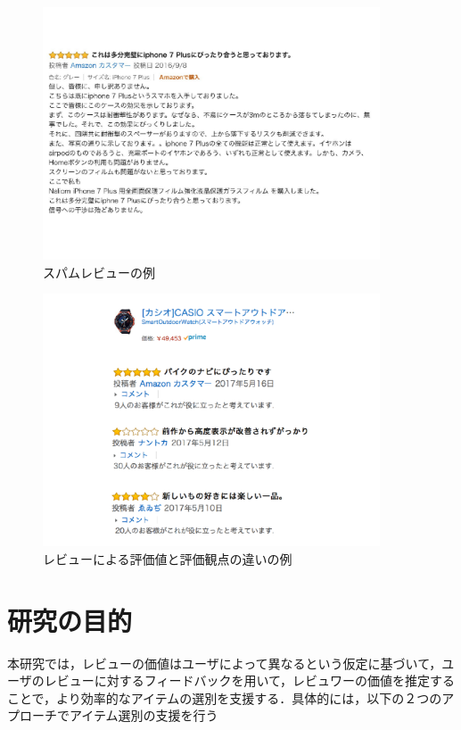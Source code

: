 \documentclass[a4paper,11pt,oneside,openany]{jsbook}
\begin{document}
\begin{figure}[htb]
	\begin{center} %
		\includegraphics[width = 100mm]{figures/spam_review.pdf} %
	\end{center}
	\caption{スパムレビューの例} %
	\label{fig:spam} %
\end{figure}

\begin{figure}[htb]
	\begin{center} %
		\includegraphics[width = 100mm]{figures/review_example.pdf} %
	\end{center}
	\caption{レビューによる評価値と評価観点の違いの例} %
	\label{fig:review_example} %
\end{figure}

	\section{研究の目的}
本研究では，レビューの価値はユーザによって異なるという仮定に基づいて，ユーザのレビューに対するフィードバックを用いて，レビュワーの価値を推定することで，より効率的なアイテムの選別を支援する．具体的には，以下の２つのアプローチでアイテム選別の支援を行う
\par
\end{document}
